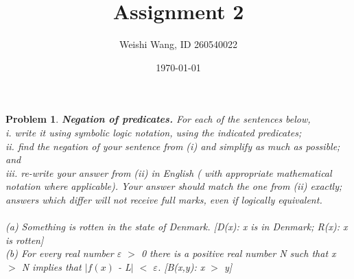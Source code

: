 \documentclass{article}
\newtheorem{problem}{Problem}
\theoremstyle{definition}
\begin{document}
 \title{Assignment 2} 

\author{Weishi Wang, ID 260540022} 

\date{\today}

\maketitle

\begin{problem} 
\textbf{Negation of predicates.} For each of the sentences below,\\
	i. write it using symbolic logic notation, using the indicated predicates;\\
	ii. find the negation of your sentence from (i) and simplify as much as possible; and\\
	iii. re-write your answer from (ii) in English ( with appropriate mathematical notation where applicable). Your answer should match the one from (ii) exactly; answers which differ will not receive full marks, even if logically equivalent.\\\\
(a) Something is rotten in the state of Denmark. [D(x): x is in Denmark; R(x): x is rotten]\\
(b) For every real number \(\varepsilon\) \(>\) 0 there is a positive real number N such that x \(>\) N implies that \(| f(x)\) - L\(|\) \(<\) \(\varepsilon\). [B(x,y): x \(>\) y]\\\\


\end{problem}
\end{document}
